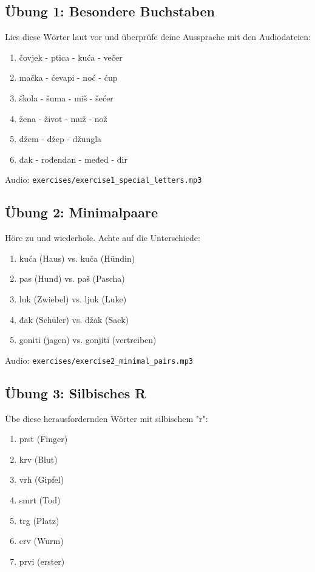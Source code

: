 \subsection{Übung 1: Besondere Buchstaben}

Lies diese Wörter laut vor und überprüfe deine Aussprache mit den Audiodateien:

\begin{enumerate}
    \item čovjek - ptica - kuća - večer
    \item mačka - ćevapi - noć - ćup
    \item škola - šuma - miš - šećer
    \item žena - život - muž - nož
    \item džem - džep - džungla
    \item đak - rođendan - međed - đir
\end{enumerate}

Audio: \texttt{exercises/exercise1\_special\_letters.mp3}

\subsection{Übung 2: Minimalpaare}

Höre zu und wiederhole. Achte auf die Unterschiede:

\begin{enumerate}
    \item kuća (Haus) vs. kuča (Hündin)
    \item pas (Hund) vs. paš (Pascha)
    \item luk (Zwiebel) vs. ljuk (Luke)
    \item đak (Schüler) vs. džak (Sack)
    \item goniti (jagen) vs. gonjiti (vertreiben)
\end{enumerate}

Audio: \texttt{exercises/exercise2\_minimal\_pairs.mp3}

\subsection{Übung 3: Silbisches R}

Übe diese herausfordernden Wörter mit silbischem "r":

\begin{enumerate}
    \item prst (Finger)
    \item krv (Blut)
    \item vrh (Gipfel)
    \item smrt (Tod)
    \item trg (Platz)
    \item crv (Wurm)
    \item prvi (erster)
\end{enumerate}

